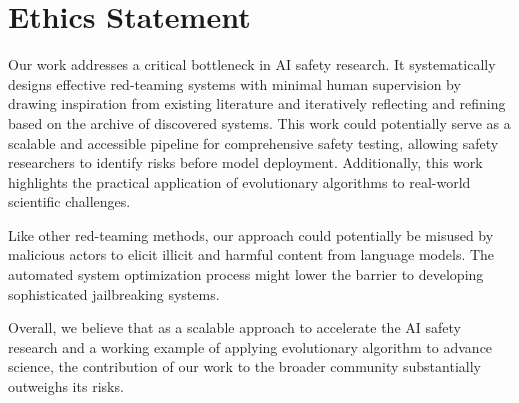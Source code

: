 \section{Ethics Statement}
Our work addresses a critical bottleneck in AI safety research. It systematically designs effective red-teaming systems with minimal human supervision by drawing inspiration from existing literature and iteratively reflecting and refining based on the archive of discovered systems. This work could potentially serve as a scalable and accessible pipeline for comprehensive safety testing, allowing safety researchers to identify risks before model deployment. Additionally, this work highlights the practical application of evolutionary algorithms to real-world scientific challenges.

Like other red-teaming methods, our approach could potentially be misused by malicious actors to elicit illicit and harmful content from language models. The automated system optimization process might lower the barrier to developing sophisticated jailbreaking systems.

Overall, we believe that as a scalable approach to accelerate the AI safety research and a working example of applying evolutionary algorithm to advance science, the contribution of our work to the broader community substantially outweighs its risks.